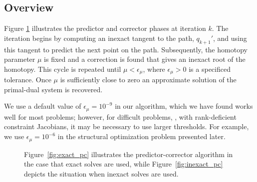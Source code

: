 \subsection{Overview}

Figure \ref{fig:pc} illustrates the predictor and corrector phases at iteration
$k$.  The iteration begins by computing an inexact tangent to the path,
$q_{k+1}'$, and using this tangent to predict the next point on the path.
Subsequently, the homotopy parameter $\mu$ is fixed and a correction is found
that gives an inexact root of the homotopy.  This cycle is repeated until $\mu <
\epsilon_\mu$, where $\epsilon_\mu > 0$ is a specificed tolerance.  Once $\mu$ is
sufficiently close to zero an approximate solution of the primal-dual system is
recovered.

\begin{remark}
  We use a default value of $\epsilon_\mu = 10^{-9}$ in our algorithm, which we
  have found works well for most problems; however, for difficult problems, \eg,
  with rank-deficient constraint Jacobians, it may be necessary to use larger
  thresholds.  For example, we use $\epsilon_\mu = 10^{-6}$ in the structural
  optimization problem presented later.
\end{remark}

\begin{figure}[tbp]
  \centering
  \hspace{3em}
 \caption{ Figure~\ref{fig:exact_pc} illustrates the predictor-corrector algorithm in the case that exact solves are used, while Figure~\ref{fig:inexact_pc} depicts the situation when inexact solves are used. \label{fig:pc}}   
\end{figure}


